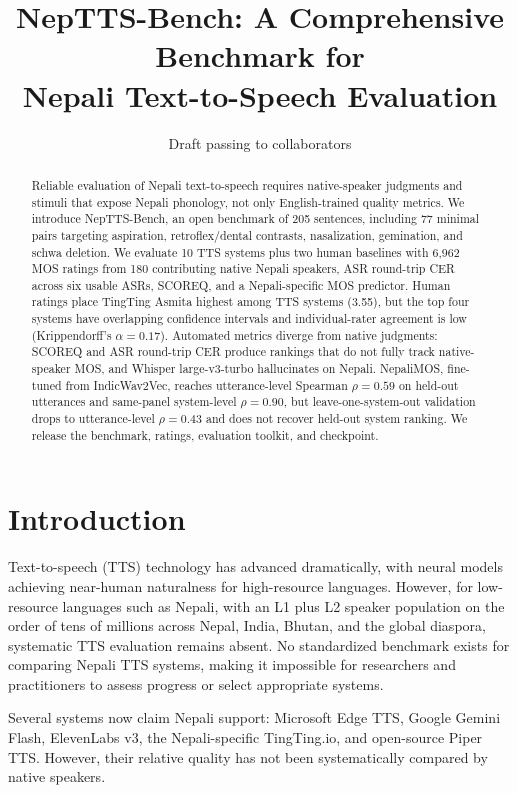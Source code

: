 \documentclass[11pt]{article}
\title{NepTTS-Bench: A Comprehensive Benchmark for\\Nepali Text-to-Speech Evaluation}
\author{Draft passing to collaborators}
\date{}
\begin{document}
\maketitle

\begin{abstract}
Reliable evaluation of Nepali text-to-speech requires native-speaker judgments and stimuli that expose Nepali phonology, not only English-trained quality metrics. We introduce NepTTS-Bench, an open benchmark of 205 sentences, including 77 minimal pairs targeting aspiration, retroflex/dental contrasts, nasalization, gemination, and schwa deletion. We evaluate 10 TTS systems plus two human baselines with 6{,}962 MOS ratings from 180 contributing native Nepali speakers, ASR round-trip CER across six usable ASRs, SCOREQ, and a Nepali-specific MOS predictor. Human ratings place TingTing Asmita highest among TTS systems (3.55), but the top four systems have overlapping confidence intervals and individual-rater agreement is low (Krippendorff's $\alpha = 0.17$). Automated metrics diverge from native judgments: SCOREQ and ASR round-trip CER produce rankings that do not fully track native-speaker MOS, and Whisper large-v3-turbo hallucinates on Nepali. NepaliMOS, fine-tuned from IndicWav2Vec, reaches utterance-level Spearman $\rho = 0.59$ on held-out utterances and same-panel system-level $\rho = 0.90$, but leave-one-system-out validation drops to utterance-level $\rho = 0.43$ and does not recover held-out system ranking. We release the benchmark, ratings, evaluation toolkit, and checkpoint.
\end{abstract}

\section{Introduction}

Text-to-speech (TTS) technology has advanced dramatically, with neural models achieving near-human naturalness for high-resource languages. However, for low-resource languages such as Nepali, with an L1 plus L2 speaker population on the order of tens of millions across Nepal, India, Bhutan, and the global diaspora, systematic TTS evaluation remains absent. No standardized benchmark exists for comparing Nepali TTS systems, making it impossible for researchers and practitioners to assess progress or select appropriate systems.

Several systems now claim Nepali support: Microsoft Edge TTS, Google Gemini Flash, ElevenLabs v3, the Nepali-specific TingTing.io, and open-source Piper TTS. However, their relative quality has not been systematically compared by native speakers.
\end{document}
